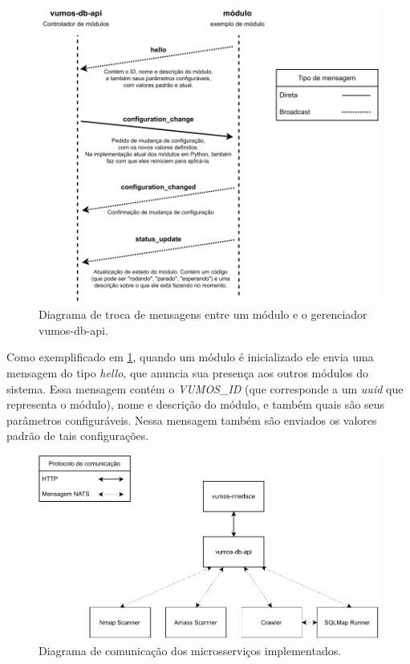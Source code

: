     \begin{figure}
        \includegraphics[scale=0.8]{figuras/vumos-module-communication.drawio.pdf}
        \caption{Diagrama de troca de mensagens entre um módulo e o gerenciador vumos-db-api.\label{fig:module-communication}}
    \end{figure}
    
    Como exemplificado em \ref{fig:module-communication}, quando um módulo é inicializado ele envia uma mensagem do tipo \textit{hello}, que anuncia sua presença aos outros módulos do
    sistema. Essa mensagem contém o \textit{VUMOS\_ID} (que corresponde a um 
    \textit{uuid} que representa o módulo), nome e descrição do 
    módulo, e também quais são seus parâmetros configuráveis. Nessa mensagem também são enviados os valores padrão de tais configurações.

    
    \begin{figure}
        \includegraphics[scale=0.8]{figuras/vumos-Microservices.pdf}
        \caption{Diagrama de comunicação dos microsserviços implementados.\label{fig:microservices}}
    \end{figure}
    
